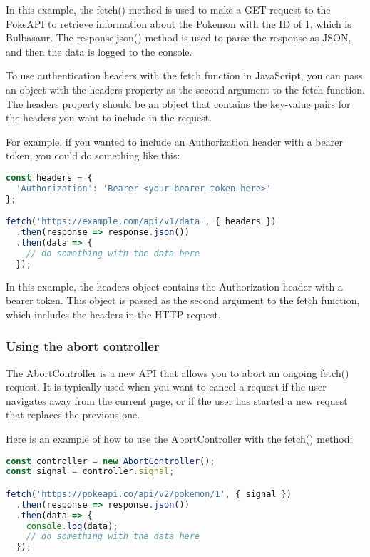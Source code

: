 {In this example, the fetch() method is used to make a GET request to the PokeAPI to retrieve information about the Pokemon with the ID of 1, which is Bulbasaur. The response.json() method is used to parse the response as JSON, and then the data is logged to the console.


To use authentication headers with the fetch function in JavaScript, you can pass an object with the headers property as the second argument to the fetch function. The headers property should be an object that contains the key-value pairs for the headers you want to include in the request.

For example, if you wanted to include an Authorization header with a bearer token, you could do something like this:

\begin{lstlisting}[language=Javascript, caption="Authroization header example with fetch]
const headers = {
  'Authorization': 'Bearer <your-bearer-token-here>'
};

fetch('https://example.com/api/v1/data', { headers })
  .then(response => response.json())
  .then(data => {
    // do something with the data here
  });

\end{lstlisting}

In this example, the headers object contains the Authorization header with a bearer token. This object is passed as the second argument to the fetch function, which includes the headers in the HTTP request.

\subsubsection{Using the abort controller}
The AbortController is a new API that allows you to abort an ongoing fetch() request. It is typically used when you want to cancel a request if the user navigates away from the current page, or if the user has started a new request that replaces the previous one.

Here is an example of how to use the AbortController with the fetch() method:

\begin{lstlisting}[language=Javascript, caption=AbortController example]
const controller = new AbortController();
const signal = controller.signal;

fetch('https://pokeapi.co/api/v2/pokemon/1', { signal })
  .then(response => response.json())
  .then(data => {
    console.log(data);
    // do something with the data here
  });


\end{lstlisting}}
